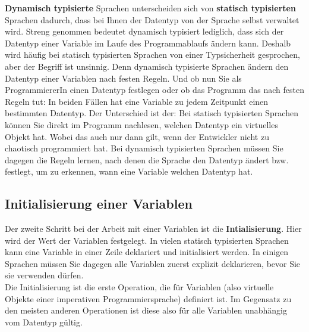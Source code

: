\textbf{Dynamisch typisierte} Sprachen unterscheiden sich von \textbf{statisch typisierten} Sprachen dadurch, dass bei Ihnen der Datentyp von der Sprache selbst verwaltet wird. Streng genommen bedeutet dynamisch typisiert lediglich, dass sich der Datentyp einer Variable im Laufe des Programmablaufs ändern kann. Deshalb wird häufig bei statisch typisierten Sprachen von einer Typsicherheit gesprochen, aber der Begriff ist unsinnig. Denn dynamisch typisierte Sprachen ändern den Datentyp einer Variablen nach festen Regeln. Und ob nun Sie als ProgrammiererIn einen Datentyp festlegen oder ob das Programm das nach festen Regeln tut: In beiden Fällen hat eine Variable zu jedem Zeitpunkt einen bestimmten Datentyp. Der Unterschied ist der: Bei statisch typisierten Sprachen können Sie direkt im Programm nachlesen, welchen Datentyp ein virtuelles Objekt hat. Wobei das auch nur dann gilt, wenn der Entwickler nicht zu chaotisch programmiert hat. Bei dynamisch typisierten Sprachen müssen Sie dagegen die Regeln lernen, nach denen die Sprache den Datentyp ändert bzw. festlegt, um zu erkennen, wann eine Variable welchen Datentyp hat.\\

\subsection{Initialisierung einer Variablen}

Der zweite Schritt bei der Arbeit mit einer Variablen ist die \textbf{Intialisierung}. Hier wird der Wert der Variablen festgelegt. In vielen statisch typisierten Sprachen kann eine Variable in einer Zeile deklariert und initialisiert werden. In einigen Sprachen müssen Sie dagegen alle Variablen zuerst explizit deklarieren, bevor Sie sie verwenden dürfen.\\

Die Initialisierung ist die erste Operation, die für Variablen (also virtuelle Objekte einer imperativen Programmiersprache) definiert ist. Im Gegensatz zu den meisten anderen Operationen ist diese also für alle Variablen unabhängig vom Datentyp gültig.

